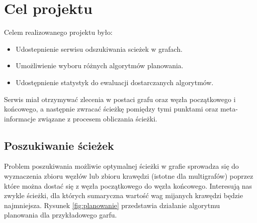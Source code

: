 \chapter{Cel projektu}

Celem realizowanego projektu było:

\begin{itemize}
	\item Udostepnienie serwisu odszukiwania scieżek w grafach.
	\item Umożliwienie wyboru różnych algorytmów planowania.
	\item Udostępnienie statystyk do ewaluacji dostarczanych algorytmów.
\end{itemize}

Serwis miał otrzymywać zlecenia w postaci grafu oraz węzła początkowego i końcowego, a następnie zwracać ścieżkę pomiędzy tymi punktami oraz meta-informacje związane z procesem obliczania ścieżki.

\section{Poszukiwanie ścieżek}

Problem poszukiwania możliwie optymalnej ścieżki w grafie sprowadza się do wyznaczenia zbioru węzłów lub zbioru krawędzi (istotne dla multigrafów) poprzez które można dostać się z węzła początkowego do węzła końcowego.
Interesują nas zwykle ścieżki, dla których sumaryczna wartość wag mijanych krawędzi będzie najmniejsza.
Rysunek \ref{fig:planowanie} przedstawia działanie algorytmu planowania dla przykładowego garfu.

